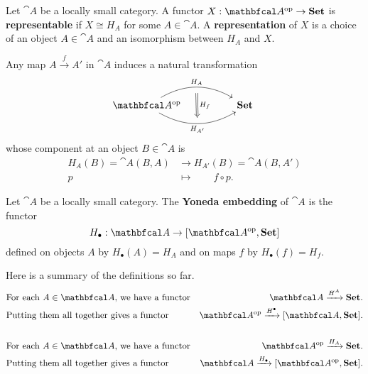 \documentclass[11pt,a4paper]{article}
\begin{document}
\begin{definition}
    Let $\cat{A}$ be a locally small category. A functor $X:\catop{A}\to\bcat{Set}$ is \textbf{representable} if $X\cong H_A$ for some $A\in\cat{A}$. A \textbf{representation} of $X$ is a choice of an object $A\in\cat{A}$ and an isomorphism between $H_A$ and $X$.
\end{definition}

Any map $A\xrightarrow{f}A'$ in $\cat{A}$ induces a natural transformation
\begin{equation*}
\begin{tikzcd}
    \catop{A}
    \arrow[rr, bend left=30, "H_A"{name=t}]
    \arrow[rr, bend right=30, "H_{A'}"'{name=b}]
    && \bcat{Set} \
    \arrow[from=t, Rightarrow, to=b, "H_f", shorten <= 6pt, shorten >= 6pt]
\end{tikzcd}
\end{equation*}
whose component at an object $B\in\cat{A}$ is 
\begin{align*}
    H_A(B)=\cat{A}(B,A) &\to H_{A'}(B)=\cat{A}(B,A')\\
    p\qquad &\mapsto\qquad f\circ p.
\end{align*}

\begin{definition}
    Let $\cat{A}$ be a locally small category. The \textbf{Yoneda embedding} of $\cat{A}$ is the functor
    \begin{equation*}
        H_{\bullet}:\cat{A}\to [\catop{A},\bcat{Set}]
    \end{equation*}
    defined on objects $A$ by $H_{\bullet}(A)=H_A$ and on maps $f$ by $H_{\bullet}(f)=H_f$.
\end{definition}

Here is a summary of the definitions so far.
\begin{align*}
    &\text{For each $A\in\cat{A}$, we have a functor} &\cat{A} \xrightarrow{H^A} \bcat{Set}.\\
    &\text{Putting them all together gives a functor} &\catop{A} \xrightarrow{H^{\bullet}} [\cat{A},\bcat{Set}].\\ \\
    &\text{For each $A\in\cat{A}$, we have a functor} &\catop{A} \xrightarrow{H_A} \bcat{Set}.\\
    &\text{Putting them all together gives a functor} &\cat{A} \xrightarrow{H_{\bullet}} [\catop{A},\bcat{Set}].
\end{align*}
\end{document}
